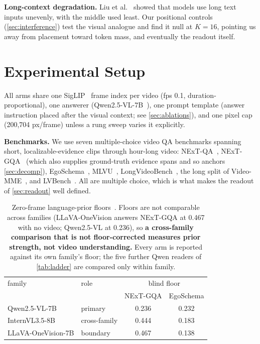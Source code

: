 \documentclass[10pt,twocolumn,letterpaper]{article}
\begin{document}
\noindent\textbf{Long-context degradation.} Liu et al.~\cite{liu2024lost} showed that models use long text inputs unevenly, with the middle used least. Our positional controls (\cref{sec:interference}) test the visual analogue and find it null at $K{=}16$, pointing us away from placement toward token mass, and eventually the readout itself.

\section{Experimental Setup}
\label{sec:setup}

All arms share one SigLIP~\cite{zhai2023siglip} frame index per video (fps 0.1, duration-proportional), one answerer (Qwen2.5-VL-7B~\cite{qwen25vl}), one prompt template (answer instruction placed after the visual context; see \cref{sec:ablations}), and one pixel cap (200,704 px/frame) unless a rung sweep varies it explicitly.

\noindent\textbf{Benchmarks.} We use seven multiple-choice video QA benchmarks spanning short, localizable-evidence clips through hour-long video: NExT-QA~\cite{xiao2021nextqa}, NExT-GQA~\cite{xiao2024nextgqa} (which also supplies ground-truth evidence spans and so anchors \cref{sec:decomp}), EgoSchema~\cite{mangalam2023egoschema}, MLVU~\cite{zhou2024mlvu}, LongVideoBench~\cite{wu2024longvideobench}, the long split of Video-MME~\cite{fu2025videomme}, and LVBench~\cite{wang2025lvbench}. All are multiple choice, which is what makes the readout of \cref{sec:readout} well defined.

\begin{table}[t]
\centering
\footnotesize
\setlength{\tabcolsep}{2.5pt}
\begin{tabular}{llcc}
\toprule
family & role & \multicolumn{2}{c}{blind floor}\\
 & & NExT-GQA & EgoSchema\\
\midrule
Qwen2.5-VL-7B & primary & 0.236 & 0.232\\
InternVL3.5-8B & cross-family & 0.444 & 0.183\\
LLaVA-OneVision-7B & boundary & 0.467 & 0.138\\
\bottomrule
\end{tabular}
\caption{Zero-frame language-prior floors~\cite{li2024onevision,qwen25vl,wang2025internvl35}. Floors are not comparable across families (LLaVA-OneVision answers NExT-GQA at 0.467 with no video; Qwen2.5-VL at 0.236), so \textbf{a cross-family comparison that is not floor-corrected measures prior strength, not video understanding.} Every arm is reported against its own family's floor; the five further Qwen readers of \cref{tab:ladder} are compared only within family.}
\label{tab:floors}
\end{table}
\end{document}
